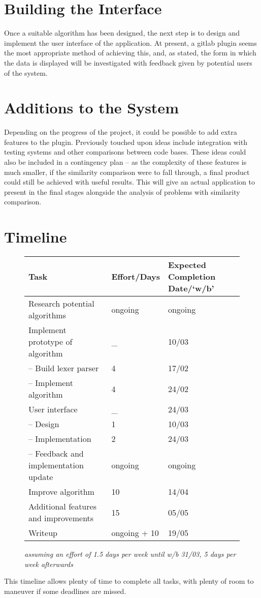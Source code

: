 \section{Building the Interface}

Once a suitable algorithm has been designed, the next step is to design and 
implement the user interface of the application. At present, a gitlab plugin
seems the most appropriate method of achieving this, and, as stated, the
form in which the data is displayed will be investigated with feedback given by
potential users of the system.

\section{Additions to the System}

Depending on the progress of the project, it could be possible to add extra
features to the plugin. Previously touched upon ideas include integration with
testing systems and other comparisons between code bases. These ideas could also
be included in a contingency plan -- as the complexity of these features is much
smaller, if the similarity comparison were to fall through, a final product could
still be achieved with useful results. This will give an actual application to
present in the final stages alongside the analysis of problems with similarity
comparison.

\section{Timeline}
\begin{figure}[ht!]
\centering
\begin{tabular}{ | l | l | l| }
	\hline
	\textbf{Task} & \textbf{Effort/Days} & \textbf{Expected Completion Date/`w/b'} \\ \hline
	\hline
	Research potential algorithms & ongoing & ongoing \\ \hline
	Implement prototype of algorithm & \_ & 10/03 \\ \hline
	-- Build lexer parser & 4 & 17/02 \\ \hline
	-- Implement algorithm & 4 & 24/02 \\ \hline
	User interface & \_ & 24/03 \\ \hline
	-- Design & 1 & 10/03 \\ \hline
	-- Implementation & 2 & 24/03 \\ \hline
	-- Feedback and implementation update & ongoing & ongoing \\ \hline
	Improve algorithm & 10 & 14/04 \\ \hline
	Additional features and improvements & 15 & 05/05 \\ \hline
	Writeup & ongoing + 10 & 19/05 \\ \hline
\end{tabular}
\emph{assuming an effort of 1.5 days per week until w/b 31/03, 5 days per week afterwards}		
\end{figure}

This timeline allows plenty of time to complete all tasks, with plenty of room to
maneuver if some deadlines are missed.